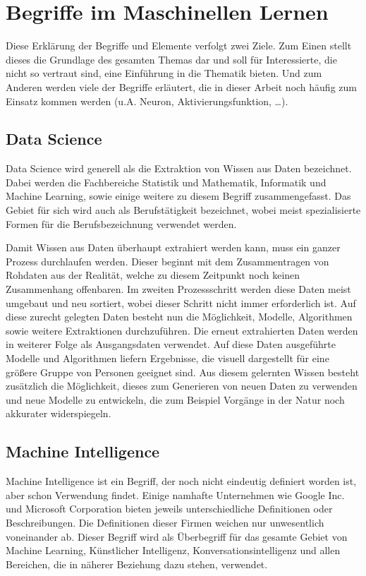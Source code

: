 \chapter{Begriffe im Maschinellen Lernen}
\label{cha:Begriffe}

Diese Erklärung der Begriffe und Elemente verfolgt zwei Ziele.
Zum Einen stellt dieses die Grundlage des gesamten Themas dar und soll für Interessierte, die nicht so vertraut sind, eine Einführung in die Thematik bieten. 
Und zum Anderen werden viele der Begriffe erläutert, die in dieser Arbeit noch häufig zum Einsatz kommen werden (u.A. Neuron, Aktivierungsfunktion, …).

\section{Data Science}

Data Science wird generell als die Extraktion von Wissen aus Daten bezeichnet. 
Dabei werden die Fachbereiche Statistik und Mathematik, Informatik und Machine Learning, sowie einige weitere zu diesem Begriff zusammengefasst. 
Das Gebiet für sich wird auch als Berufstätigkeit bezeichnet, wobei meist spezialisierte Formen für die Berufsbezeichnung verwendet werden. \newline

\noindent 
Damit Wissen aus Daten überhaupt extrahiert werden kann, muss ein ganzer Prozess durchlaufen werden. 
Dieser beginnt mit dem Zusammentragen von Rohdaten aus der Realität, welche zu diesem Zeitpunkt noch keinen Zusammenhang offenbaren. 
Im zweiten Prozessschritt werden diese Daten meist umgebaut und neu sortiert, wobei dieser Schritt nicht immer erforderlich ist. 
Auf diese zurecht gelegten Daten besteht nun die Möglichkeit, Modelle, Algorithmen sowie weitere Extraktionen durchzuführen. 
Die erneut extrahierten Daten werden in weiterer Folge als Ausgangsdaten verwendet. 
Auf diese Daten ausgeführte Modelle und Algorithmen liefern Ergebnisse, die visuell dargestellt für eine größere Gruppe von Personen geeignet sind. 
Aus diesem gelernten Wissen besteht zusätzlich die Möglichkeit, dieses zum Generieren von neuen Daten zu verwenden und neue Modelle zu entwickeln, die zum Beispiel Vorgänge in der Natur noch akkurater widerspiegeln.

\section{Machine Intelligence}

Machine Intelligence ist ein Begriff, der noch nicht eindeutig definiert worden ist, aber schon Verwendung findet. 
Einige namhafte Unternehmen wie Google Inc. und Microsoft Corporation bieten jeweils unterschiedliche Definitionen oder Beschreibungen. 
Die Definitionen dieser Firmen weichen nur unwesentlich voneinander ab.
Dieser Begriff wird als Überbegriff für das gesamte Gebiet von Machine Learning, Künstlicher Intelligenz, Konversationsintelligenz und allen Bereichen, die in näherer Beziehung dazu stehen, verwendet. 

